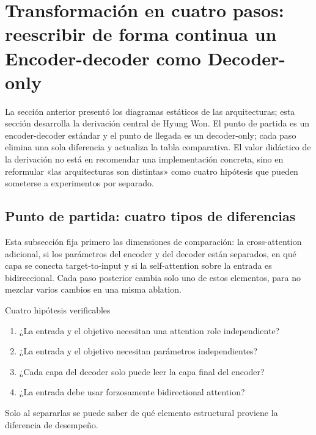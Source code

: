\section{Transformación en cuatro pasos: reescribir de forma continua un Encoder-decoder como Decoder-only}

La sección anterior presentó los diagramas estáticos de las arquitecturas; esta sección desarrolla la derivación central de Hyung Won. El punto de partida es un encoder-decoder estándar y el punto de llegada es un decoder-only; cada paso elimina una sola diferencia y actualiza la tabla comparativa. El valor didáctico de la derivación no está en recomendar una implementación concreta, sino en reformular «las arquitecturas son distintas» como cuatro hipótesis que pueden someterse a experimentos por separado.

\subsection{Punto de partida: cuatro tipos de diferencias}

Esta subsección fija primero las dimensiones de comparación: la cross-attention adicional, si los parámetros del encoder y del decoder están separados, en qué capa se conecta target-to-input y si la self-attention sobre la entrada es bidireccional. Cada paso posterior cambia solo uno de estos elementos, para no mezclar varios cambios en una misma ablation.


\begin{importantbox}{Cuatro hipótesis verificables}
\begin{enumerate}
  \item ¿La entrada y el objetivo necesitan una attention role independiente?
  \item ¿La entrada y el objetivo necesitan parámetros independientes?
  \item ¿Cada capa del decoder solo puede leer la capa final del encoder?
  \item ¿La entrada debe usar forzosamente bidirectional attention?
\end{enumerate}
Solo al separarlas se puede saber de qué elemento estructural proviene la diferencia de desempeño.
\end{importantbox}


